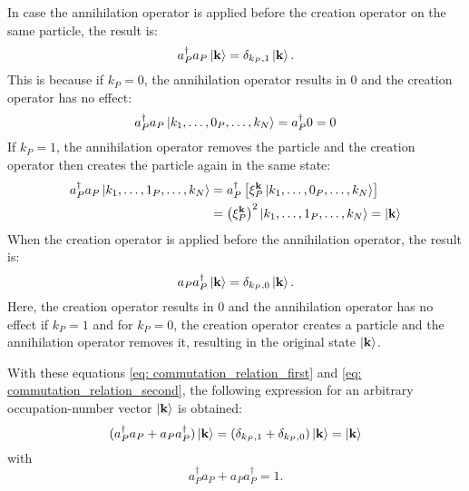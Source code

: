 In case the annihilation operator is applied before the creation operator on the same particle, the result is:
\begin{equation}
    a_P^{\dagger} a_P \ket{\mathbf{k}} = \delta_{k_P, 1} \ket{\mathbf{k}}. \label{eq: commutation_relation_first}
\end{equation}
This is because if $k_P = 0$, the annihilation operator results in $0$ and the creation operator has no effect:
\begin{equation}
    a_P^{\dagger} a_P \ket{k_1, \ldots, 0_P, \ldots, k_N} = a_P^{\dagger} 0 = 0
\end{equation}
If $k_P = 1$, the annihilation operator removes the particle and the creation operator then creates the particle again in the same state:
\begin{equation}
    \begin{split}
        a_P^{\dagger} a_P \ket{k_1, \ldots, 1_P, \ldots, k_N} &= a_P^{\dagger} \left [ \xi_P^{\mathbf{k}} \ket{k_1, \ldots, 0_P, \ldots, k_N} \right ]\\
        &=  \left (\xi_P^{\mathbf{k}} \right )^2 \ket{k_1, \ldots, 1_P, \ldots, k_N} = \ket{\mathbf{k}}
    \end{split}
\end{equation}
When the creation operator is applied before the annihilation operator, the result is:
\begin{equation}
    a_P a_P^{\dagger} \ket{\mathbf{k}} = \delta_{k_P, 0} \ket{\mathbf{k}}. \label{eq: commutation_relation_second}
\end{equation}
Here, the creation operator results in $0$ and the annihilation operator has no effect if $k_P = 1$ and for $k_P = 0$, the creation operator creates a particle and the annihilation operator removes it, resulting in the original state $\ket{\mathbf{k}}$.

With these equations \eqref{eq: commutation_relation_first} and \eqref{eq: commutation_relation_second}, the following expression for an arbitrary occupation-number vector $\ket{\textbf{k}}$ is obtained: 
\begin{equation}
    (a_P^{\dagger} a_P + a_P a_P^{\dagger}) \ket{\mathbf{k}} = (\delta_{k_P, 1} + \delta_{k_P, 0}) \ket{\mathbf{k}} = \ket{\mathbf{k}}
\end{equation}
with 
\begin{equation}
    a_P^{\dagger} a_P + a_P a_P^{\dagger} = 1.
\end{equation}

